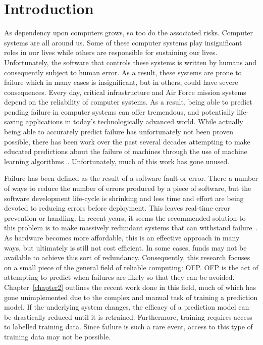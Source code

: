 \chapter{Introduction} \label{chapter1}
As dependency upon computers grows, so too do the associated risks.  Computer
systems are all around us.  Some of these computer systems play insignificant
roles in our lives while others are responsible for sustaining our lives.
Unfortunately, the software that controls these systems is written by humans
and consequently subject to human error.  As a result, these systems are prone
to failure which in many cases is insignificant, but in others, could have
severe consequences.  Every day, critical infrastructure and Air Force mission
systems depend on the reliability of computer systems.  As a result, being able
to predict pending failure in computer systems can offer tremendous, and
potentially life-saving applications in today's technologically advanced world.
While actually being able to accurately predict failure has unfortunately not
been proven possible, there has been work over the past several decades
attempting to make educated predictions about the failure of machines through
the use of machine learning algorithms~\cite{salfnerSurvey}.  Unfortunately,
much of this work has gone unused.  

Failure has been defined as the result of a software fault or error.  There a
number of ways to reduce the number of errors produced by a piece of software,
but the software development life-cycle is shrinking and less time and effort
are being devoted to reducing errors before deployment.  This leaves real-time
error prevention or handling.  In recent years, it seems the recommended
solution to this problem is to make massively redundant systems that can
withstand failure~\cite{bauer2012}.  As hardware becomes more affordable, this
is an effective approach in many ways, but ultimately is still not cost
efficient.  In some cases, funds may not be available to achieve this sort of
redundancy.  Consequently, this research focuses on a small piece of the
general field of reliable computing: \ac{OFP}.  \ac{OFP} is the act of
attempting to predict when failures are likely so that they can be avoided.
Chapter~\ref{chapter2} outlines the recent work done in this field, much of
which has gone unimplemented due to the complex and manual task of training a
prediction model.  If the underlying system changes, the efficacy of a
prediction model can be drastically reduced until it is retrained.
Furthermore, training requires access to labelled training data.  Since failure
is such a rare event, access to this type of training data may not be possible.  

